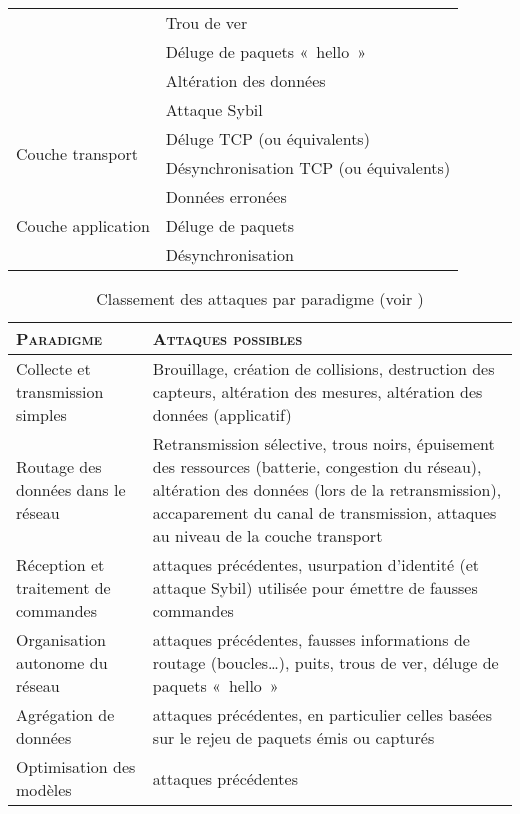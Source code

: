 \begin{table}[!ht]
\begin{small}
\begin{tabular}{m{}|p{}}
                & \num{Trou de ver}\\
                & \num{Déluge de paquets « hello »}\\
                & \num{Altération des données}\\
                & \num{Attaque Sybil}\\
            \midrule
            \multirow{2}{*}{Couche transport}%
                & \num{Déluge TCP (ou équivalents)}\\
                & \num{Désynchronisation TCP (ou équivalents)}\\
            \midrule
            \multirow{3}{*}{Couche application}%
                & \num{Données erronées}\\
                & \num{Déluge de paquets}\\
                & \num{Désynchronisation}\\
            \bottomrule
        \end{tabular}
    \end{small}
\end{table}
\begin{table}[!ht]
    \caption{Classement des attaques par paradigme (voir )}\label{ea:tab:paradigm}
    \centering
    \medskip
    \begin{small}
        \begin{tabular}{m{}|m{}}
            \toprule
            \textsc{Paradigme} & \textsc{Attaques possibles}\\
            \midrule
            Collecte et transmission simples & Brouillage, création de collisions, destruction des capteurs, altération des mesures, altération des données (applicatif)\\
            \midrule
            Routage des données dans le réseau & Retransmission sélective, trous noirs, épuisement des ressources (batterie, congestion du réseau), altération des données (lors de la retransmission), accaparement du canal de transmission, attaques au niveau de la couche transport\\
            \midrule
            Réception et traitement de commandes & attaques précédentes, usurpation d'identité (et attaque Sybil) utilisée pour émettre de fausses commandes\\
            \midrule
            Organisation autonome du réseau & attaques précédentes, fausses informations de routage (boucles\dots), puits, trous de ver, déluge de paquets « hello »\\
            \midrule
            Agrégation de données & attaques précédentes, en particulier celles basées sur le rejeu de paquets émis ou capturés\\
            \midrule
            Optimisation des modèles & attaques précédentes\\
            \bottomrule
         \end{tabular}
     \end{small}
\end{table}

